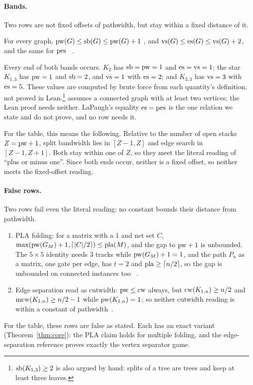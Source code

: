 \paragraph{Bands.} Two rows are not fixed offsets of pathwidth, but stay within
a fixed distance of it.

\begin{theorem}[bands]\label{thm:bands}
For every graph, $\mathrm{pw}(G)\le\mathrm{sb}(G)\le\mathrm{pw}(G)+1$ \citep[Thm~8]{LY2002ref12}, and
$\mathrm{vs}(G)\le\mathrm{es}(G)\le\mathrm{vs}(G)+2$, and the same for $\mathrm{pes}$
\citep[Thm~2.1]{EllisSudboroughTurner1994}~.
\end{theorem}
Every end of both bands occurs. $K_2$ has $\mathrm{sb}=\mathrm{pw}=1$ and $\mathrm{es}=\mathrm{vs}=1$; the star
$K_{1,3}$ has $\mathrm{pw}=1$ and $\mathrm{sb}=2$, and $\mathrm{vs}=1$ with $\mathrm{es}=2$; and $K_{3,3}$ has
$\mathrm{vs}=3$ with $\mathrm{es}=5$. These values are computed by brute force from each
quantity's definition, not proved in Lean.\footnote{$\mathrm{sb}(K_{1,3})\ge2$ is
also argued by hand: splits of a tree are trees and keep at least three
leaves.} \citet{LY2002ref12} assumes a connected graph with at least two
vertices; the Lean proof needs neither. LaPaugh's equality $\mathrm{es}=\mathrm{pes}$
\citep{LaPaugh1993} is the one relation we state and do not prove, and no row
needs it.

For the table, this means the following. Relative to the number of open
stacks $Z=\mathrm{pw}+1$, split bandwidth lies in $[Z-1,Z]$ and edge search in
$[Z-1,Z+1]$. Both stay within one of $Z$, so they meet the literal reading of
``plus or minus one''. Since both ends occur, neither is a fixed offset, so
neither meets the fixed-offset reading.

\paragraph{False rows.} Two rows fail even the literal reading: no constant
bounds their distance from pathwidth.

\begin{theorem}\label{thm:false}
\leavevmode
\begin{enumerate}
\item PLA folding: for a matrix with a 1 and net set $C$,
  $\max(\mathrm{pw}(G_M)+1,\lceil|C|/2\rceil)\le\mathrm{pla}(M)$, and the gap to $\mathrm{pw}+1$ is
  unbounded. The $5\times5$ identity needs 3 tracks while $\mathrm{pw}(G_M)+1=1$, and the
  path $P_n$ as a matrix, one gate per edge, has $t=2$ and
  $\mathrm{pla}\ge\lceil n/2\rceil$, so the gap is unbounded on connected instances too
  \citep[Prop.~3.15]{LY2002ref6}~.
\item Edge separation read as cutwidth: $\mathrm{pw}\le\mathrm{cw}$ always, but
  $\mathrm{cw}(K_{1,n})\ge n/2$ and $\mathrm{mcw}(K_{1,n})\ge n/2-1$ while $\mathrm{pw}(K_{1,n})=1$; so
  neither cutwidth reading is within a constant of pathwidth~.
\end{enumerate}
\end{theorem}
For the table, these rows are false as stated. Each has an exact variant
(Theorem~\ref{thm:core}): the PLA claim holds for multiple folding, and the
edge-separation reference proves exactly the vertex separator game.

